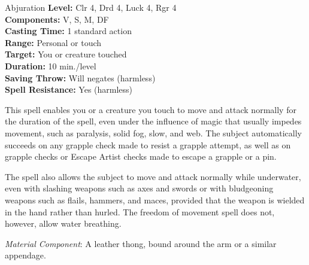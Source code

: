 {Abjuration}
{
	\textbf{Level:}
	Clr 4, Drd 4, Luck 4, Rgr 4\\
	\textbf{Components:}
	V, S, M, DF\\
	\textbf{Casting Time:}
	1 standard action\\
	\textbf{Range:}
	Personal or touch\\
	\textbf{Target:}
	You or creature touched\\
	\textbf{Duration:}
	10 min./level\\
	\textbf{Saving Throw:}
	Will negates (harmless)\\
	\textbf{Spell Resistance:}
	Yes (harmless)\\
}
{
	This spell enables you or a creature you touch to move and attack normally for the duration of the spell, even under the influence of magic that usually impedes movement, such as paralysis, solid fog, slow, and web. The subject automatically succeeds on any grapple check made to resist a grapple attempt, as well as on grapple checks or Escape Artist checks made to escape a grapple or a pin.

	The spell also allows the subject to move and attack normally while underwater, even with slashing weapons such as axes and swords or with bludgeoning weapons such as flails, hammers, and maces, provided that the weapon is wielded in the hand rather than hurled. The freedom of movement spell does not, however, allow water breathing.

	\textit{Material Component}:
	A leather thong, bound around the arm or a similar appendage.

}
